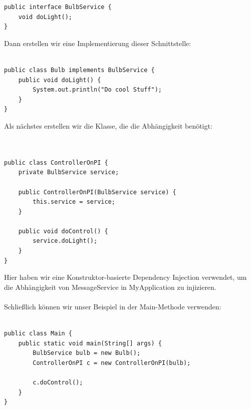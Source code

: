 \documentclass[../vs-script-first-v01.tex]{subfiles}
\begin{document}
\noindent\begin{minipage}{\textwidth}
\begin{lstlisting}[caption={Schnittstelle für die Abhängigkeit},captionpos=b,label={lst:di-interface}]
public interface BulbService {
    void doLight();
}
\end{lstlisting}
\end{minipage}

Dann erstellen wir eine Implementierung dieser Schnittstelle:\\
\noindent\begin{minipage}{\textwidth}
\begin{lstlisting}[caption={Schnittstellenimplementierung},captionpos=b,label={lst:di-interface-implementation}]

public class Bulb implements BulbService {
    public void doLight() {
        System.out.println("Do cool Stuff");
    }
}
\end{lstlisting}
\end{minipage}
Als nächstes erstellen wir die Klasse, die die Abhängigkeit benötigt:\\\\
\noindent\begin{minipage}{\textwidth}
\begin{lstlisting}[caption={Dependency},captionpos=b,label={lst:di-dependency}]

public class ControllerOnPI {
    private BulbService service;
    
    public ControllerOnPI(BulbService service) {
        this.service = service;
    }
    
    public void doControl() {
        service.doLight();
    }
}
\end{lstlisting}
\end{minipage}
Hier haben wir eine Konstruktor-basierte Dependency Injection verwendet, um die Abhängigkeit von MessageService in MyApplication zu injizieren.
\\\\
Schließlich können wir unser Beispiel in der Main-Methode verwenden:\\\\
\noindent\begin{minipage}{\textwidth}
\begin{lstlisting}[caption={Die DI Main},captionpos=b,label={lst:di-main}]
public class Main {
    public static void main(String[] args) {
        BulbService bulb = new Bulb();
        ControllerOnPI c = new ControllerOnPI(bulb);
        
        c.doControl();
    }
}
\end{lstlisting}
\end{minipage}
\end{document}
